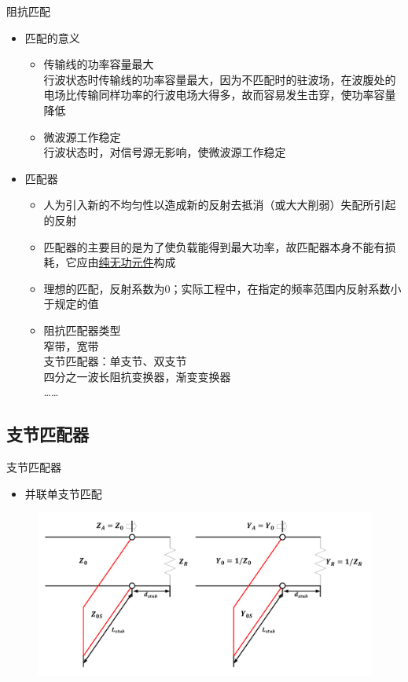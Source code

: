 \begin{frame}{阻抗匹配}
  \begin{itemize}
    \item 匹配的意义
          \begin{itemize}
            \item 传输线的功率容量最大\\
                  行波状态时传输线的功率容量最大，因为不匹配时的驻波场，在波腹处的电场比传输同样功率的行波电场大得多，故而容易发生击穿，使功率容量降低
            \item 微波源工作稳定\\
                  行波状态时，对信号源无影响，使微波源工作稳定
          \end{itemize}
    \item 匹配器
          \begin{itemize}
            \item 人为引入新的不均匀性以造成新的反射去抵消（或大大削弱）失配所引起的反射
            \item 匹配器的主要目的是为了使负载能得到最大功率，故匹配器本身不能有损耗，它应由\uline{纯无功元件}构成
            \item 理想的匹配，反射系数为0；实际工程中，在指定的频率范围内反射系数小于规定的值
            \item 阻抗匹配器类型 \\
                  窄带，宽带\\
                  支节匹配器：单支节、双支节\\
                  四分之一波长阻抗变换器，渐变变换器\\
                  ……
          \end{itemize}
  \end{itemize}
\end{frame}

\subsection{支节匹配器}
\begin{frame}{支节匹配器}
  \begin{itemize}
    \item 并联单支节匹配
  \end{itemize}
  \centering
  \begin{figure}
    \includegraphics[width=12cm]{Cha4//fig4-23.pdf}
  \end{figure}
\end{frame}

